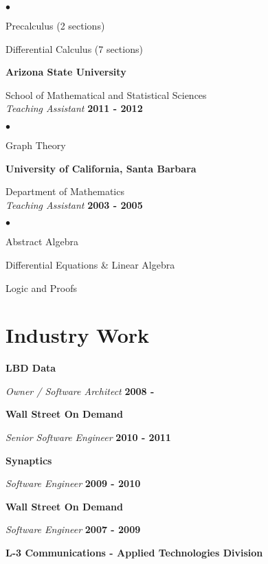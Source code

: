 \documentclass[margin,line]{res}
\newenvironment{list2}{
  \begin{list}{$\bullet$}{%
      \setlength{\itemsep}{0in}
      \setlength{\parsep}{0in} \setlength{\parskip}{0in}
      \setlength{\topsep}{0in} \setlength{\partopsep}{0in} 
      \setlength{\leftmargin}{0.2in}}}{\end{list}}
\begin{document}
\begin{resume}
\begin{list2}
\item Precalculus (2 sections)
\item Differential Calculus (7 sections)
\end{list2}

{\bf Arizona State University}

\vspace{-.4cm}
School of Mathematical and Statistical Sciences \\
{\em Teaching Assistant} \hfill {\bf 2011 - 2012} 

\begin{list2}
\item Graph Theory
\end{list2}

{\bf University of California, Santa Barbara}

\vspace{-.4cm}
Department of Mathematics \\
{\em Teaching Assistant} \hfill {\bf 2003 - 2005} 

\begin{list2}
\item Abstract Algebra
\item Differential Equations \& Linear Algebra 
\item Logic and Proofs
\end{list2}

\section{\sc Industry Work}

{\bf LBD Data}

\vspace{-.4cm}
{\em Owner / Software Architect} \hfill {\bf 2008 - \phantom{2017}}

{\bf Wall Street On Demand}

\vspace{-.4cm}
{\em Senior Software Engineer} \hfill {\bf 2010 - 2011}

{\bf Synaptics}

\vspace{-.4cm}
{\em Software Engineer} \hfill {\bf 2009 - 2010}

{\bf Wall Street On Demand}

\vspace{-.4cm}
{\em Software Engineer} \hfill {\bf 2007 - 2009}

{\bf L-3 Communications - Applied Technologies Division}


\end{resume}
\end{document}
